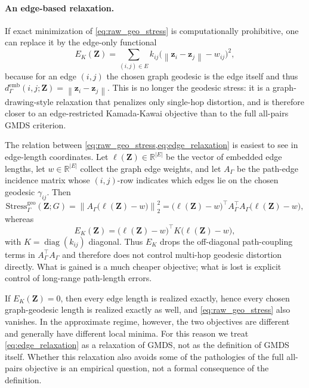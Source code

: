 \documentclass[twoside,11pt]{article}
\newcommand{\R}{\mathbb{R}}
\newcommand{\bz}{\mathbf{z}}
\newcommand{\bZ}{\mathbf{Z}}
\newcommand{\norm}[1]{\left\|#1\right\|}
\newcommand{\demb}{d^{\mathrm{emb}}}
\newcommand{\Stress}{\mathrm{Stress}}
\newcommand{\diag}{\operatorname{diag}}
\begin{document}
\paragraph{An edge-based relaxation.}
If exact minimization of \cref{eq:raw_geo_stress} is computationally
prohibitive, one can replace it by the edge-only functional
\begin{equation}
  E_K(\bZ)
  = \sum_{(i,j) \in E} k_{ij}\bigl(\norm{\bz_i - \bz_j} - w_{ij}\bigr)^2,
  \label{eq:edge_relaxation}
\end{equation}
because for an edge $(i,j)$ the chosen graph geodesic is the edge itself and
thus $\demb_{\Gamma}(i,j;\bZ) = \norm{\bz_i - \bz_j}$.  This is no longer the
geodesic stress: it is a graph-drawing-style relaxation that penalizes only
single-hop distortion, and is therefore closer to an edge-restricted
Kamada-Kawai objective \citep{kamada1989algorithm, fruchterman1991graph}
than to the full all-pairs GMDS criterion.

The relation between \cref{eq:raw_geo_stress,eq:edge_relaxation} is easiest to
see in edge-length coordinates.  Let $\ell(\bZ) \in \R^{|E|}$ be the vector of
embedded edge lengths, let $w \in \R^{|E|}$ collect the graph edge weights, and
let $A_{\Gamma}$ be the path-edge incidence matrix whose $(i,j)$-row indicates
which edges lie on the chosen geodesic $\gamma_{ij}$.  Then
\begin{equation}
  \Stress^{\mathrm{geo}}_{\Gamma}(\bZ; G)
  = \norm{A_{\Gamma}\bigl(\ell(\bZ) - w\bigr)}_2^2
  = \bigl(\ell(\bZ)-w\bigr)^\top
    A_{\Gamma}^\top A_{\Gamma}
    \bigl(\ell(\bZ)-w\bigr),
  \label{eq:path_incidence_stress}
\end{equation}
whereas
\begin{equation}
  E_K(\bZ)
  = \bigl(\ell(\bZ)-w\bigr)^\top K \bigl(\ell(\bZ)-w\bigr),
  \label{eq:edge_relaxation_matrix}
\end{equation}
with $K = \diag(k_{ij})$ diagonal.  Thus $E_K$ drops the off-diagonal
path-coupling terms in $A_{\Gamma}^\top A_{\Gamma}$ and therefore does not
control multi-hop geodesic distortion directly.  What is gained is a much
cheaper objective; what is lost is explicit control of long-range path-length
errors.

If $E_K(\bZ) = 0$, then every edge length is realized exactly, hence every
chosen graph-geodesic length is realized exactly as well, and
\cref{eq:raw_geo_stress} also vanishes.  In the approximate regime, however,
the two objectives are different and generally have different local minima.
For this reason we treat \cref{eq:edge_relaxation} as a relaxation of GMDS,
not as the definition of GMDS itself.  Whether this relaxation also avoids
some of the pathologies of the full all-pairs objective is an empirical
question, not a formal consequence of the definition.
\end{document}
